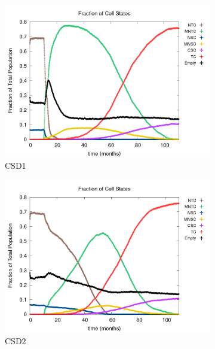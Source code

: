\documentclass[\main/thesis.tex]{subfiles}
\begin{document}
\begin{figure}[H]
    \centering
    \begin{subfigure}[t]{.6\textwidth}
      \centering
      \includegraphics[width=\textwidth]{images/4_CarcinFunc/Fig2/numState_all_Func1.png}
      \caption{CSD1}
      \label{fig:CarcinFunc_numState_Func1}
    \end{subfigure}
    \begin{subfigure}[t]{.6\textwidth}
      \centering
      \includegraphics[width=\textwidth]{images/4_CarcinFunc/Fig2/numState_all_Func2.png}
      \caption{CSD2}
      \label{fig:CarcinFunc_numState_Func2}
    \end{subfigure}
    \begin{subfigure}[t]{.6\textwidth}

\end{subfigure}
\end{figure}
\end{document}
